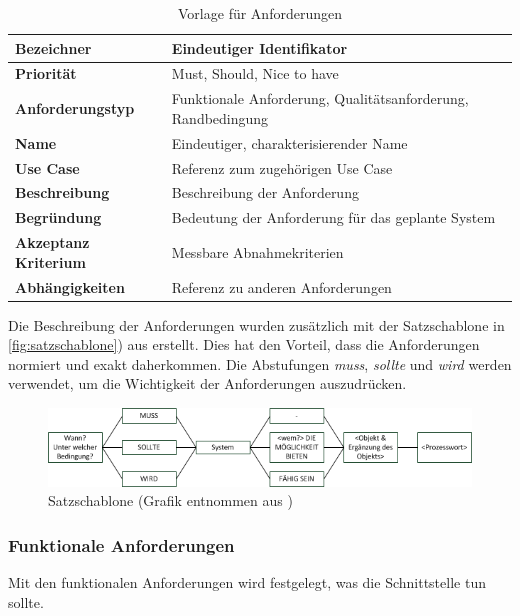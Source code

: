 \begin{table}[ht]
\centering
  \begin{tabular}{ l | p{8cm} }
	\hline
	\rowcolor{gray}
	\textbf{Bezeichner}&	\textbf{Eindeutiger Identifikator}\\ \hline
	\textbf{Priorität} 		&	Must, Should, Nice to have\\ \hline
	\textbf{Anforderungstyp}	&	Funktionale Anforderung, Qualitätsanforderung, Randbedingung\\ \hline
	\textbf{Name} 			&	Eindeutiger, charakterisierender Name\\ \hline
	\textbf{Use Case} 		&	Referenz zum zugehörigen Use Case\\ \hline
	\textbf{Beschreibung} 	&	Beschreibung der Anforderung\\ \hline
	\textbf{Begründung} 		&	Bedeutung der Anforderung für das geplante System\\ \hline
	\textbf{Akzeptanz Kriterium}	&	Messbare Abnahmekriterien\\ \hline
	\textbf{Abhängigkeiten} 	&	Referenz zu anderen Anforderungen\\ \hline
  \end{tabular}
   \caption{Vorlage für Anforderungen}\label{table:req_template}
\end{table}


Die Beschreibung der Anforderungen wurden zusätzlich mit der Satzschablone in \autoref{fig:satzschablone}) aus \cite{req_eng_book} erstellt. Dies hat den Vorteil, dass die 
Anforderungen normiert und exakt daherkommen. Die Abstufungen \textit{muss}, \textit{sollte} und \textit{wird} werden verwendet, um die Wichtigkeit der Anforderungen auszudrücken.
\begin{figure}[h]
\includegraphics[scale=0.95]{images/anforderungen/satzschablone.png}
\caption[Satzschablone]{Satzschablone (Grafik entnommen aus \cite{req_eng_book})}
\label{fig:satzschablone}
\end{figure}


\newpage
\FloatBarrier
\subsubsection{Funktionale Anforderungen}\label{func_anforderungen}
Mit den funktionalen Anforderungen wird festgelegt, was die Schnittstelle tun sollte.

